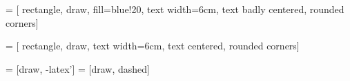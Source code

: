 \usepackage{tikz}
\usetikzlibrary{
	shapes,
    arrows,
    shapes.geometric,
    positioning,
}

 = [
	rectangle,
    draw,
    fill=blue!20,
    text width=6cm,
    text badly centered,
    rounded corners]

 = [
	rectangle,
	draw,
    text width=6cm,
    text centered,
    rounded corners]

 = [draw, -latex']
 = [draw, dashed]

